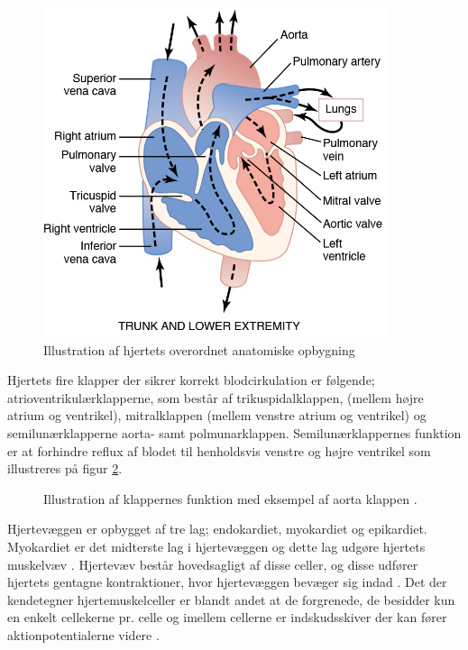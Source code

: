 \begin{figure}[H] %
\begin{center}
\includegraphics[width=0.9\textwidth]{figures/hjertet_overordnet}
\end{center}
\caption{Illustration af hjertets overordnet anatomiske opbygning \cite{Guyton2006}}
\label{fig:hjerte_overordnet}
\end{figure}

\noindent Hjertets fire klapper der sikrer korrekt blodcirkulation er følgende; atrioventrikulærklapperne, som består af trikuspidalklappen, (mellem højre atrium og ventrikel), mitralklappen (mellem venstre atrium og ventrikel) og semilunærklapperne aorta- samt polmunarklappen. Semilunærklappernes funktion er at forhindre reflux af blodet til henholdsvis venstre og højre ventrikel som illustreres på figur \ref{fig:hjerte_klap}.  \cite{gronanatomi}  

\begin{figure}[H] %
\begin{center}
 
\end{center}
\caption{Illustration af klappernes funktion med eksempel af aorta klappen \cite{cindy}.}
\label{fig:hjerte_klap}
\end{figure}


\noindent Hjertevæggen er opbygget af tre lag; endokardiet, myokardiet og epikardiet. Myokardiet er det midterste lag i hjertevæggen og dette lag udgøre hjertets muskelvæv \cite{gronanatomi}. Hjertevæv består hovedsagligt af disse celler, og disse udfører hjertets gentagne kontraktioner, hvor hjertevæggen bevæger sig indad \cite{cindy}. 
Det der kendetegner hjertemuskelceller er blandt andet at de forgrenede, de besidder kun en enkelt cellekerne pr. celle og imellem cellerne er indskudsskiver der kan fører aktionpotentialerne videre \cite{martini}.




